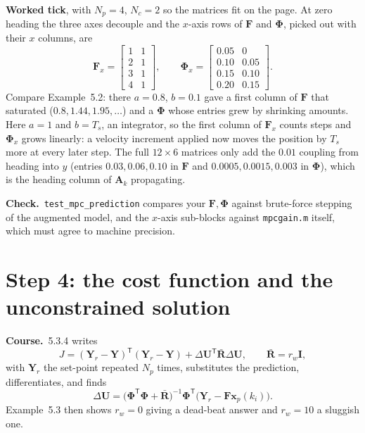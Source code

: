 \documentclass[11pt,a4paper]{article}
\newcommand{\vect}[1]{\bm{#1}}
\newcommand{\mat}[1]{\bm{#1}}
\newcommand{\T}{^{\mathsf{T}}}
\newcommand{\dU}{\Delta\vect{U}}
\newcommand{\Ts}{T_s}
\newcommand{\Np}{N_p}
\newcommand{\Nc}{N_c}
\newcommand{\Rbar}{\bar{\mat{R}}}
\newcommand{\course}{\textbf{\textcolor{blue!60!black}{Course.}}\ }
\newcommand{\tcheck}{\textbf{Check.}\ }
\begin{document}
\textbf{Worked tick}, with $\Np = 4$, $\Nc = 2$ so the matrices fit on the page. At zero heading the three axes decouple and the $x$-axis rows of $\mat F$ and $\mat\Phi$, picked out with their $x$ columns, are
\begin{equation}
\mat F_x = \begin{bmatrix}1 & 1\\ 2 & 1\\ 3 & 1\\ 4 & 1\end{bmatrix},\qquad
\mat\Phi_x = \begin{bmatrix}0.05 & 0\\ 0.10 & 0.05\\ 0.15 & 0.10\\ 0.20 & 0.15\end{bmatrix}.
\end{equation}
Compare Example~5.2: there $a = 0.8$, $b = 0.1$ gave a first column of $\mat F$ that saturated ($0.8, 1.44, 1.95, \ldots$) and a $\mat\Phi$ whose entries grew by shrinking amounts. Here $a = 1$ and $b = \Ts$, an integrator, so the first column of $\mat F_x$ counts steps and $\mat\Phi_x$ grows linearly: a velocity increment applied now moves the position by $\Ts$ more at every later step. The full $12\times 6$ matrices only add the $0.01$ coupling from heading into $y$ (entries $0.03, 0.06, 0.10$ in $\mat F$ and $0.0005, 0.0015, 0.003$ in $\mat\Phi$), which is the heading column of $\mat A_k$ propagating.

\tcheck \texttt{test\_mpc\_prediction} compares your $\mat F, \mat\Phi$ against brute-force stepping of the augmented model, and the $x$-axis sub-blocks against \texttt{mpcgain.m} itself, which must agree to machine precision.

\section{Step 4: the cost function and the unconstrained solution}
\course 5.3.4 writes
\begin{equation}
J = (\vect Y_r - \vect Y)\T(\vect Y_r - \vect Y) + \dU\T\Rbar\dU,\qquad \Rbar = r_w\mat I,
\end{equation}
with $\vect Y_r$ the set-point repeated $\Np$ times, substitutes the prediction, differentiates, and finds
\begin{equation}
\dU = \big(\mat\Phi\T\mat\Phi + \Rbar\big)^{-1}\mat\Phi\T\big(\vect Y_r - \mat F\vect x_p(k_i)\big).
\end{equation}
Example~5.3 then shows $r_w = 0$ giving a dead-beat answer and $r_w = 10$ a sluggish one.
\end{document}
